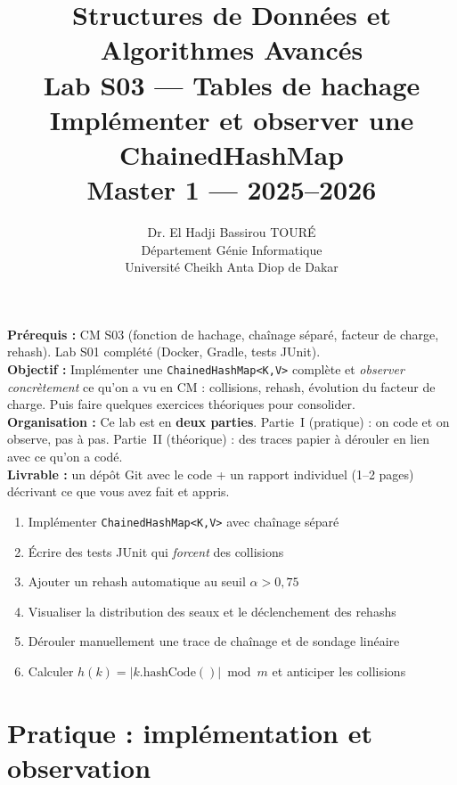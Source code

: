 \documentclass[11pt,a4paper]{article}
\title{%
\vspace{-1cm}
\textbf{\LARGE Structures de Données et}\\
\textbf{\LARGE Algorithmes Avancés}\\[0.8cm]
\textbf{\huge Lab S03 --- Tables de hachage}\\[0.3cm]
\textbf{\Large Implémenter et observer une ChainedHashMap}\\[0.5cm]
\large Master 1 --- 2025--2026}
\author{Dr. El Hadji Bassirou TOURÉ\\
Département Génie Informatique\\
Université Cheikh Anta Diop de Dakar}
\date{}
\begin{document}
\maketitle
\thispagestyle{empty}

\begin{prereqbox}
\textbf{Prérequis :} CM S03 (fonction de hachage, chaînage séparé, facteur de charge, rehash). Lab S01 complété (Docker, Gradle, tests JUnit).\\[4pt]
\textbf{Objectif :} Implémenter une \texttt{ChainedHashMap<K,V>} complète et \emph{observer concrètement} ce qu'on a vu en CM : collisions, rehash, évolution du facteur de charge. Puis faire quelques exercices théoriques pour consolider.\\[4pt]
\textbf{Organisation :} Ce lab est en \textbf{deux parties}. Partie~I (pratique) : on code et on observe, pas à pas. Partie~II (théorique) : des traces papier à dérouler en lien avec ce qu'on a codé.\\[4pt]
\textbf{Livrable :} un dépôt Git avec le code + un rapport individuel (1--2 pages) décrivant ce que vous avez fait et appris.
\end{prereqbox}

\begin{objectifbox}
\begin{enumerate}[nosep]
    \item Implémenter \texttt{ChainedHashMap<K,V>} avec chaînage séparé
    \item Écrire des tests JUnit qui \emph{forcent} des collisions
    \item Ajouter un rehash automatique au seuil $\alpha > 0{,}75$
    \item Visualiser la distribution des seaux et le déclenchement des rehashs
    \item Dérouler manuellement une trace de chaînage et de sondage linéaire
    \item Calculer $h(k) = |k.\text{hashCode}()| \bmod m$ et anticiper les collisions
\end{enumerate}
\end{objectifbox}

\tableofcontents
\newpage

\part{Pratique : implémentation et observation}
\end{document}

